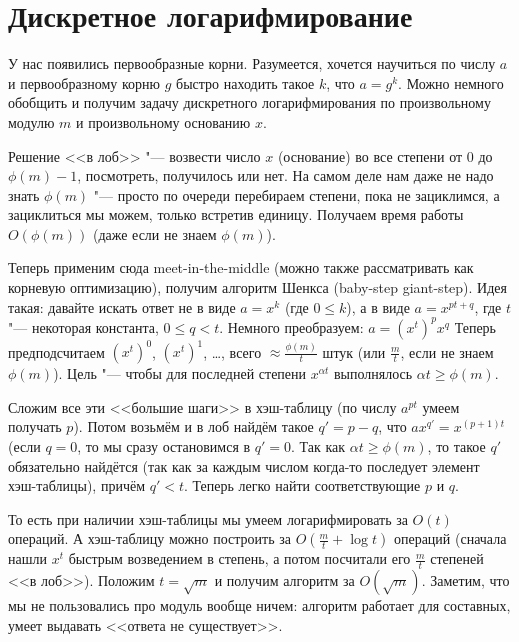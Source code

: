 \section{Дискретное логарифмирование}
У нас появились первообразные корни.
Разумеется, хочется научиться по числу $a$ и первообразному корню $g$ быстро находить такое $k$, что $a=g^k$.
Можно немного обобщить и получим задачу дискретного логарифмирования по произвольному модулю $m$ и произвольному основанию $x$.

Решение <<в лоб>> "--- возвести число $x$ (основание) во все степени от $0$ до $\phi(m)-1$, посмотреть, получилось или нет.
На самом деле нам даже не надо знать $\phi(m)$ "--- просто по очереди перебираем степени, пока не зациклимся, а зациклиться мы можем, только встретив единицу.
Получаем время работы $O(\phi(m))$ (даже если не знаем $\phi(m)$).

Теперь применим сюда meet-in-the-middle (можно также рассматривать как корневую оптимизацию), получим алгоритм Шенкса (baby-step giant-step).
Идея такая: давайте искать ответ не в виде $a=x^k$ (где $0 \le k$), а в виде $a=x^{pt+q}$, где $t$ "--- некоторая константа, $0 \le q < t$.
Немного преобразуем: $a=(x^t)^px^q$
Теперь предподсчитаем $(x^t)^0$, $(x^t)^1$, \dots, всего $\approx \frac{\phi(m)}{t}$ штук (или $\frac{m}{t}$, если не знаем $\phi(m)$).
Цель "--- чтобы для последней степени $x^{\alpha t}$ выполнялось $\alpha t \ge \phi(m)$.
\begin{center}

\end{center}
Сложим все эти <<большие шаги>> в хэш-таблицу (по числу $a^{pt}$ умеем получать $p$).
Потом возьмём и в лоб найдём такое $q'=p-q$, что $ax^{q'} = x^{(p+1)t}$ (если $q=0$, то мы сразу остановимся в $q'=0$.
Так как $\alpha t \ge \phi(m)$, то такое $q'$ обязательно найдётся (так как за каждым числом когда-то последует элемент хэш-таблицы), причём $q'<t$.
Теперь легко найти соответствующие $p$ и $q$.

То есть при наличии хэш-таблицы мы умеем логарифмировать за $O(t)$ операций.
А хэш-таблицу можно построить за $O(\frac{m}{t} + \log t)$ операций (сначала нашли $x^t$ быстрым возведением в степень, а потом посчитали его $\frac mt$ степеней <<в лоб>>).
Положим $t=\sqrt m$ и получим алгоритм за $O(\sqrt m)$.
Заметим, что мы не пользовались про модуль вообще ничем: алгоритм работает для составных, умеет выдавать <<ответа не существует>>.
 